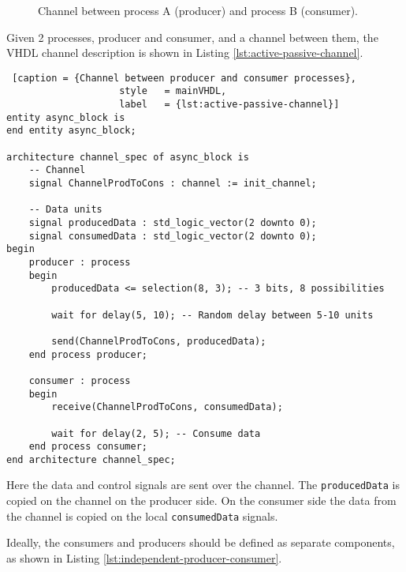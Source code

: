 \documentclass{report}
\begin{document}
\begin {figure}[H]
\centering
{}
\caption {Channel between process A (producer) and process B (consumer).}
\label {fig:passive-active-channels}
\end {figure}

Given 2 processes, producer and consumer, and a channel between them, the VHDL
channel description is shown in Listing \ref{lst:active-passive-channel}.

\begin{lstlisting} [caption = {Channel between producer and consumer processes},
                    style   = mainVHDL,
                    label   = {lst:active-passive-channel}]
entity async_block is
end entity async_block;

architecture channel_spec of async_block is
    -- Channel
    signal ChannelProdToCons : channel := init_channel;

    -- Data units
    signal producedData : std_logic_vector(2 downto 0);
    signal consumedData : std_logic_vector(2 downto 0);
begin
    producer : process
    begin
        producedData <= selection(8, 3); -- 3 bits, 8 possibilities

        wait for delay(5, 10); -- Random delay between 5-10 units

        send(ChannelProdToCons, producedData);
    end process producer;

    consumer : process
    begin
        receive(ChannelProdToCons, consumedData);

        wait for delay(2, 5); -- Consume data
    end process consumer;
end architecture channel_spec;
\end{lstlisting}

Here the data and control signals are sent over the channel. The
\lstinline{producedData} is copied on the channel on the producer side. On the
consumer side the data from the channel is copied on the local
\lstinline{consumedData} signals.

Ideally, the consumers and producers should be defined as separate components,
as shown in Listing \ref{lst:independent-producer-consumer}.
\end{document}
